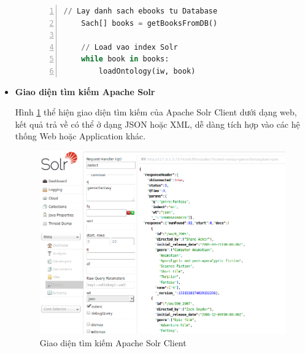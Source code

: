 \begin{itemize}
\begin{itemize}
\begin{lstlisting}[language=Python,numbers=left,frame=single, basicstyle=\ttfamily\small]
    // Lay danh sach ebooks tu Database
    Sach[] books = getBooksFromDB()
    
    // Load vao index Solr
    while book in books:
        loadOntology(iw, book)
        \end{lstlisting}

    \end{itemize}
    
    
    \item \textbf{Giao diện tìm kiếm Apache Solr}
    
    Hình \ref{fig:solr_client} thể hiện giao diện tìm kiếm của Apache Solr Client dưới dạng web, kết quả trả về có thể ở dạng JSON hoặc XML, dễ dàng tích hợp vào các hệ thống Web hoặc Application khác.
     
     \begin{figure}[H]
        \centering
        \includegraphics[width=1\textwidth]{img/solr.png}
        \caption{Giao diện tìm kiếm Apache Solr Client}
        \label{fig:solr_client}
    \end{figure}
    
    
\end{itemize}
